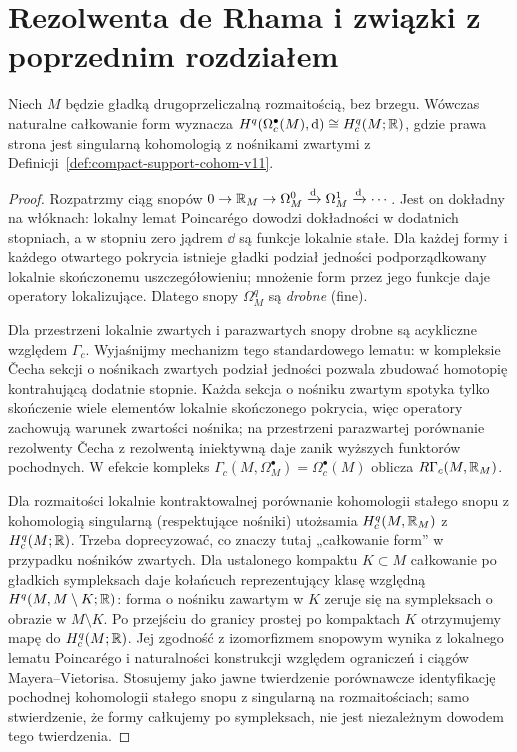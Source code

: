 \section{Rezolwenta de Rhama i związki z poprzednim rozdziałem}
\begin{twierdzenie}
\label{thm:de-rham-sheaf-v12}
Niech $M$ będzie gładką drugoprzeliczalną rozmaitością,
bez brzegu. Wówczas naturalne całkowanie form wyznacza
$H^q(\Omega_c^\bullet(M),\mathrm d)\cong H_c^q(M;\mathbb{R})$,
gdzie prawa strona jest singularną kohomologią z nośnikami
zwartymi z Definicji~\ref{def:compact-support-cohom-v11}.
\end{twierdzenie}
\begin{proof}
Rozpatrzmy ciąg snopów
$0\to\mathbb{R}_M\to\Omega_M^0\xrightarrow{\mathrm d}\Omega_M^1
\xrightarrow{\mathrm d}\cdots$. Jest on dokładny na włóknach:
lokalny lemat Poincarégo dowodzi dokładności w dodatnich
stopniach, a w stopniu zero jądrem $\dd$ są funkcje lokalnie
stałe. Dla każdej formy i każdego otwartego pokrycia
istnieje gładki podział jedności podporządkowany
lokalnie skończonemu uszczegółowieniu; mnożenie form
przez jego funkcje daje operatory lokalizujące.
Dlatego snopy $\Omega_M^q$ są \emph{drobne} (fine).

Dla przestrzeni lokalnie zwartych i parazwartych snopy
drobne są acykliczne względem $\Gamma_c$. Wyjaśnijmy
mechanizm tego standardowego lematu: w kompleksie
\v{C}echa sekcji o nośnikach zwartych podział jedności
pozwala zbudować homotopię kontrahującą dodatnie
stopnie. Każda sekcja o nośniku zwartym spotyka tylko
skończenie wiele elementów lokalnie skończonego pokrycia,
więc operatory zachowują warunek zwartości nośnika;
na przestrzeni parazwartej porównanie rezolwenty
\v{C}echa z rezolwentą iniektywną daje zanik wyższych
funktorów pochodnych. W efekcie kompleks
$\Gamma_c(M,\Omega_M^\bullet)=\Omega_c^\bullet(M)$
oblicza $R\Gamma_c(M,\mathbb{R}_M)$.

Dla rozmaitości lokalnie kontraktowalnej porównanie
kohomologii stałego snopu z kohomologią singularną
(respektujące nośniki) utożsamia
$H_c^q(M,\mathbb{R}_M)$ z $H_c^q(M;\mathbb{R})$.
Trzeba doprecyzować, co znaczy tutaj „całkowanie form”
w przypadku nośników zwartych. Dla ustalonego kompaktu
$K\subset M$ całkowanie po gładkich sympleksach daje
kołańcuch reprezentujący klasę względną
$H^q(M,M\setminus K;\mathbb{R})$: forma o nośniku zawartym
w $K$ zeruje się na sympleksach o obrazie w $M\setminus K$.
Po przejściu do granicy prostej po kompaktach $K$
otrzymujemy mapę do $H_c^q(M;\mathbb{R})$.
Jej zgodność z izomorfizmem snopowym wynika z lokalnego
lematu Poincarégo i naturalności konstrukcji względem
ograniczeń i ciągów Mayera--Vietorisa.
Stosujemy jako jawne twierdzenie porównawcze
identyfikację pochodnej kohomologii stałego snopu
z singularną na rozmaitościach; samo stwierdzenie,
że formy całkujemy po sympleksach, nie jest niezależnym
dowodem tego twierdzenia.
\end{proof}


